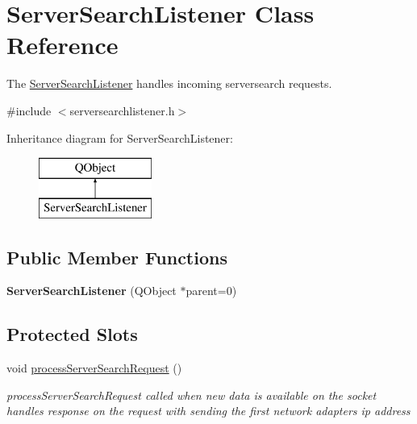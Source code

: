 \hypertarget{class_server_search_listener}{\section{Server\-Search\-Listener Class Reference}
\label{class_server_search_listener}
}


The \hyperlink{class_server_search_listener}{Server\-Search\-Listener} handles incoming serversearch requests.  




{\ttfamily \#include $<$serversearchlistener.\-h$>$}

Inheritance diagram for Server\-Search\-Listener\-:\begin{figure}[H]
\begin{center}
\leavevmode
\includegraphics[height=2.000000cm]{class_server_search_listener}
\end{center}
\end{figure}
\subsection*{Public Member Functions}
\begin{DoxyCompactItemize}
\item 
\hypertarget{class_server_search_listener_aa3ee0bdea4c0c4151c3882644e42eb5d}{{\bfseries Server\-Search\-Listener} (Q\-Object $\ast$parent=0)}\label{class_server_search_listener_aa3ee0bdea4c0c4151c3882644e42eb5d}

\end{DoxyCompactItemize}
\subsection*{Protected Slots}
\begin{DoxyCompactItemize}
\item 
\hypertarget{class_server_search_listener_a21a16b4da531df945508189dc7d4d704}{void \hyperlink{class_server_search_listener_a21a16b4da531df945508189dc7d4d704}{process\-Server\-Search\-Request} ()}\label{class_server_search_listener_a21a16b4da531df945508189dc7d4d704}

\begin{DoxyCompactList}\small\item\em process\-Server\-Search\-Request called when new data is available on the socket handles response on the request with sending the first network adapters ip address \end{DoxyCompactList}\end{DoxyCompactItemize}


